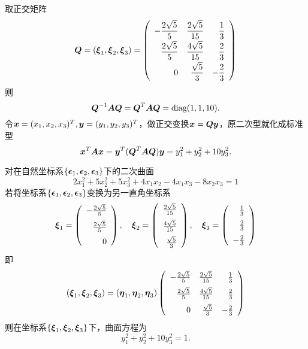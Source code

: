 \begin{frame}
  
    取正交矩阵
    $$
    \boldsymbol{Q}=(\boldsymbol{\xi}_1,\boldsymbol{\xi}_2,\boldsymbol{\xi}_3)=\left(
    \begin{array}{rrr}
      \displaystyle-\frac{2\sqrt{5}}5&\displaystyle\frac{2\sqrt{5}}{15}&\displaystyle\frac13\\[0.2cm]
      \displaystyle \frac{2\sqrt{5}}5&\displaystyle\frac{4\sqrt{5}}{15}&\displaystyle\frac23\\[0.2cm]
      \displaystyle 0&\displaystyle\frac{\sqrt{5}}3&\displaystyle-\frac23
    \end{array}
    \right)
    $$
    则
    $$
    \boldsymbol{Q}^{-1}\boldsymbol{A}\boldsymbol{Q}=\boldsymbol{Q}^{T}\boldsymbol{A}\boldsymbol{Q}=\mathrm{diag}(1,1,10).
    $$ \pause 
    令${\boldsymbol{x}}=(x_1,x_2,x_3)^T,{\boldsymbol{y}}=(y_1,y_2,y_3)^T$，做正交变换${\boldsymbol{x}}=\boldsymbol{Q}{\boldsymbol{y}}$，原二次型就化成标准型
    $$
    {\boldsymbol{x}}^T\boldsymbol{A}{\boldsymbol{x}}={\boldsymbol{y}}^T(\boldsymbol{Q}^T\boldsymbol{A}\boldsymbol{Q}){\boldsymbol{y}}=y_1^2+y_2^2+10y_3^2.
    $$
  
\end{frame}


\begin{frame}
  \begin{li}
    对在自然坐标系$\{\boldsymbol{\epsilon}_1,\boldsymbol{\epsilon}_2,\boldsymbol{\epsilon}_3\}$下的二次曲面
    $$
    2x_1^2+5x_2^2+5x_3^2+4x_1x_2-4x_1x_3-8x_2x_3=1
    $$  \pause
    若将坐标系$\{\boldsymbol{\epsilon}_1,\boldsymbol{\epsilon}_2,\boldsymbol{\epsilon}_3\}$变换为另一直角坐标系
    $$
    \boldsymbol{\xi}_1=\left(
    \begin{array}{r}
      -\frac{2\sqrt{5}}5\\[0.2cm]
       \frac{2\sqrt{5}}5\\[0.2cm]
       0
    \end{array}
    \right), \quad
    \boldsymbol{\xi}_2=\left(
    \begin{array}{r}
      \frac{2\sqrt{5}}{15}\\[0.2cm]
      \frac{4\sqrt{5}}{15}\\[0.2cm]
      \frac{\sqrt{5}}3
    \end{array}
    \right),\quad
    \boldsymbol{\xi}_3=\left(
    \begin{array}{r}
      \frac13\\[0.2cm]
      \frac23\\[0.2cm]
      -\frac23
    \end{array}
    \right)
    $$\pause
    即
    $$
    (\boldsymbol{\xi}_1,\boldsymbol{\xi}_2,\boldsymbol{\xi}_3)=(\boldsymbol{\eta}_1,\boldsymbol{\eta}_2,\boldsymbol{\eta}_3)\left(
    \begin{array}{rrr}
      -\frac{2\sqrt{5}}5&\frac{2\sqrt{5}}{15}&\frac13\\[0.2cm]
       \frac{2\sqrt{5}}5&\frac{4\sqrt{5}}{15}&\frac23\\[0.2cm]
       0&\frac{\sqrt{5}}3&-\frac23
    \end{array}
    \right)
    $$\pause
    则在坐标系$\{\boldsymbol{\xi}_1,\boldsymbol{\xi}_2,\boldsymbol{\xi}_3\}$下，曲面方程为
    $$
    y_1^2+y_2^2+10y_3^2=1.
    $$
  \end{li}
  
\end{frame}


